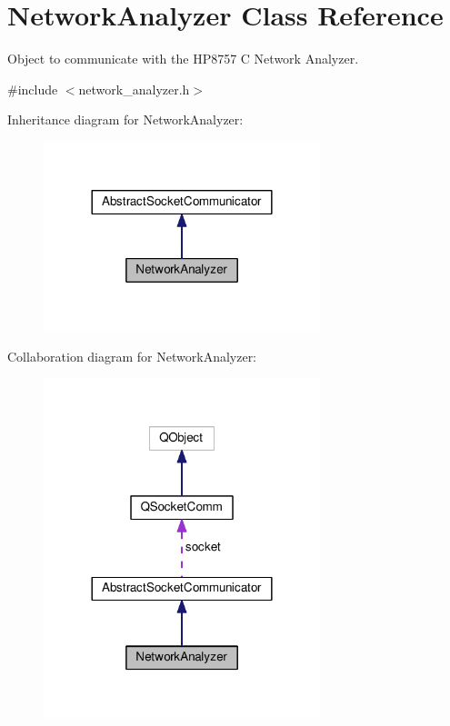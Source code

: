 \hypertarget{class_network_analyzer}{}\section{Network\+Analyzer Class Reference}
\label{class_network_analyzer}


Object to communicate with the H\+P8757 C Network Analyzer.  




{\ttfamily \#include $<$network\+\_\+analyzer.\+h$>$}



Inheritance diagram for Network\+Analyzer\+:
\nopagebreak
\begin{figure}[H]
\begin{center}
\leavevmode
\includegraphics[width=228pt]{class_network_analyzer__inherit__graph}
\end{center}
\end{figure}


Collaboration diagram for Network\+Analyzer\+:
\nopagebreak
\begin{figure}[H]
\begin{center}
\leavevmode
\includegraphics[width=228pt]{class_network_analyzer__coll__graph}
\end{center}
\end{figure}
